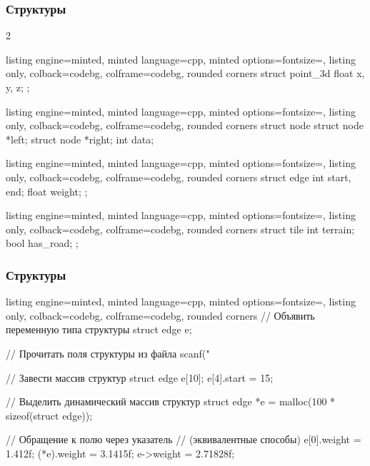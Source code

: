 \documentclass[10pt]{beamer}
\begin{document}
\begin{frame}[fragile]
\frametitle{Структуры}
\begin{multicols}{2}
\begin{tcblisting}{listing engine=minted, minted language=cpp, minted options={fontsize=\scriptsize}, listing only, colback=codebg, colframe=codebg, rounded corners}
struct point_3d {
  float x, y, z;
};
\end{tcblisting}
\begin{tcblisting}{listing engine=minted, minted language=cpp, minted options={fontsize=\scriptsize}, listing only, colback=codebg, colframe=codebg, rounded corners}
struct node {
  struct node *left;
  struct node *right;
  int data;
}
\end{tcblisting}
\columnbreak
\begin{tcblisting}{listing engine=minted, minted language=cpp, minted options={fontsize=\scriptsize}, listing only, colback=codebg, colframe=codebg, rounded corners}
struct edge {
  int start, end;
  float weight;
};
\end{tcblisting}
\begin{tcblisting}{listing engine=minted, minted language=cpp, minted options={fontsize=\scriptsize}, listing only, colback=codebg, colframe=codebg, rounded corners}
struct tile {
  int terrain;
  bool has_road;
};
\end{tcblisting}
\end{multicols}
\end{frame}

\begin{frame}[fragile]
\frametitle{Структуры}
\begin{tcblisting}{listing engine=minted, minted language=cpp, minted options={fontsize=\scriptsize}, listing only, colback=codebg, colframe=codebg, rounded corners}
// Объявить переменную типа структуры
struct edge e;

// Прочитать поля структуры из файла
scanf("%

// Завести массив структур
struct edge e[10];
e[4].start = 15;

// Выделить динамический массив структур
struct edge *e = malloc(100 * sizeof(struct edge));

// Обращение к полю через указатель
// (эквивалентные способы)
e[0].weight = 1.412f;
(*e).weight = 3.1415f;
e->weight = 2.71828f;
\end{tcblisting}
\end{frame}
\end{document}
